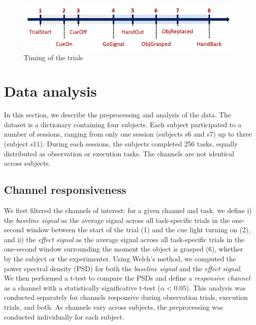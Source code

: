 \documentclass[10pt,conference,compsocconf]{IEEEtran}
\begin{document}
\begin{figure}[h!]
  \center
  \includegraphics[width=\linewidth]{images/2024-12-11-13-41-48.png}
  \caption{Timing of the trials}
\end{figure}
\FloatBarrier

\section{Data analysis}
\label{sec:analysis}
In this section, we describe the preprocessing and analysis of the data. The dataset is a dictionary containing four subjects. Each subject participated to a number of sessions, ranging from only one session (subjects s6 and s7) up to three (subject s11). During each sessions, the subjects completed 256 tasks, equally distributed as observation or execution tasks. The channels are not identical across subjects.

\subsection{Channel responsiveness}
We first filtered the channels of interest: for a given channel and task, we define i) the \textit{baseline signal} as the average signal across all task-specific trials in the one-second window between the start of the trial (1) and the cue light turning on (2), and ii) the \textit{effect signal} as the average signal across all task-specific trials in the one-second window surrounding the moment the object is grasped (6), whether by the subject or the experimenter. Using Welch's method\cite{welch}, we computed the power spectral density (PSD) for both the \textit{baseline signal} and the \textit{effect signal}. We then performed a t-test to compare the PSDs and define a \textit{responsive channel} as a channel with a statistically significative t-test (\(\alpha<0.05\)). This analysis was conducted separately for channels responsive during observation trials, execution trials, and both. As channels vary across subjects, the preprocessing was conducted individually for each subject.
\end{document}

